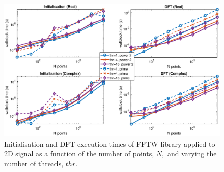 \documentclass[a4paper]{article}
\begin{document}
\begin{figure}[htb]
    \centering
    \includegraphics[width=\linewidth]{../results/fftw_2d_thr.eps}
  \caption{Initialisation and DFT execution times of FFTW library applied to 2D signal as a function of the
    number of points, $N,$ and varying the number of threads, $thr.$ }
  \label{2DFFTW}
\end{figure}
\end{document}
